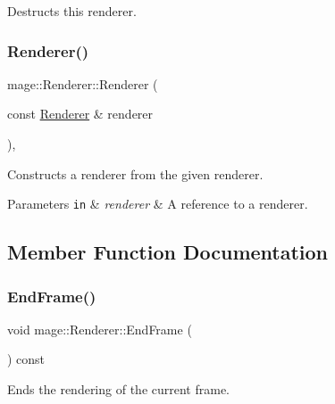 Destructs this renderer. \hypertarget{classmage_1_1_renderer_acd6b509da2bd7e7d764b45b912fe5298}{}\label{classmage_1_1_renderer_acd6b509da2bd7e7d764b45b912fe5298} 
\subsubsection{\texorpdfstring{Renderer()}{Renderer()}\hspace{0.1cm}{\footnotesize\ttfamily [2/2]}}
{\footnotesize\ttfamily mage\+::\+Renderer\+::\+Renderer (\begin{DoxyParamCaption}\item[{const \hyperlink{classmage_1_1_renderer}{Renderer} \&}]{renderer }\end{DoxyParamCaption})\hspace{0.3cm}{\ttfamily [private]}, {\ttfamily [delete]}}

Constructs a renderer from the given renderer.


\begin{DoxyParams}[1]{Parameters}
\mbox{\tt in}  & {\em renderer} & A reference to a renderer. \\
\hline
\end{DoxyParams}


\subsection{Member Function Documentation}
\hypertarget{classmage_1_1_renderer_a4932c51d0f6e56269712024d2d0322ef}{}\label{classmage_1_1_renderer_a4932c51d0f6e56269712024d2d0322ef} 
\subsubsection{\texorpdfstring{End\+Frame()}{EndFrame()}}
{\footnotesize\ttfamily void mage\+::\+Renderer\+::\+End\+Frame (\begin{DoxyParamCaption}{ }\end{DoxyParamCaption}) const}

Ends the rendering of the current frame. \hypertarget{classmage_1_1_renderer_a1843c9f9f24174ea48da8ae28537292b}{}\label{classmage_1_1_renderer_a1843c9f9f24174ea48da8ae28537292b} 
